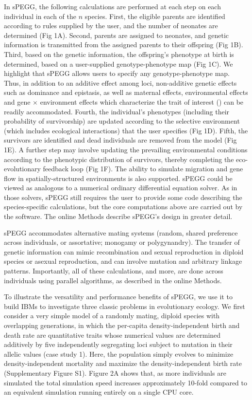\documentclass[1p,numbered]{article}
\begin{document}
\begin{linenumbers}
In sPEGG, the following calculations are performed at each step on each individual in each of the $n$ species. First, the eligible parents are identified according to rules supplied by the user, and the number of neonates are determined (Fig 1A). Second, parents are assigned to neonates, and genetic information is transmitted from the assigned parents to their offspring (Fig 1B). Third, based on the genetic information, the offspring's phenotype at birth is determined, based on a user-supplied genotype-phenotype map (Fig 1C). We highlight that sPEGG allows users to specify any genotype-phenotype map. Thus, in addition to an additive effect among loci, non-additive genetic effects such as dominance and epistasis, as well as maternal effects, environmental effects and gene $\times$ environment effects which characterize the trait of interest (\citealt{hendry13}) can be readily accommodated. Fourth, the individual's phenotypes (including their probability of survivorship) are updated according to the selective environment (which includes ecological interactions) that the user specifies (Fig 1D). Fifth, the survivors are identified and dead individuals are removed from the model (Fig 1E). A further step may involve updating the prevailing environmental conditions according to the phenotypic distribution of survivors, thereby completing the eco-evolutionary feedback loop (Fig 1F). The ability to simulate migration and gene flow in spatially-structured environments is also supported. sPEGG could be viewed as analogous to a numerical ordinary differential equation solver. As in those solvers, sPEGG still requires the user to provide some code describing the species-specific calculations, but the core computations above are carried out by the software. The online Methods describe sPEGG's design in greater detail.

sPEGG accommodates alternative mating systems (random, shared preference across individuals, or assortative;  monogamy or polygynandry). The transfer of genetic information can mimic recombination and sexual reproduction in diploid species or asexual reproduction, and can involve mutation and arbitrary linkage patterns. Importantly, all of these calculations, and more, are done across individuals using parallel algorithms, as described in the online Methods.

To illustrate the versatility and performance benefits of sPEGG, we use it to build IBMs to investigate three classic problems in evolutionary ecology. We first consider a very simple model of a randomly mating, diploid species with overlapping generations, in which the per-capita density-independent birth and death rate are quantitative traits whose numerical values are determined additively by five independently segregating loci subject to mutation in their allelic values (case study 1). Here, the population simply evolves to minimize density-independent mortality and maximize the density-independent birth rate (Supplementary Figure S1). Figure 2A shows that, as more individuals are simulated the total simulation speed increases approximately 10-fold compared to an equivalent simulation running entirely on a single CPU core.


\end{linenumbers}
\end{document}
